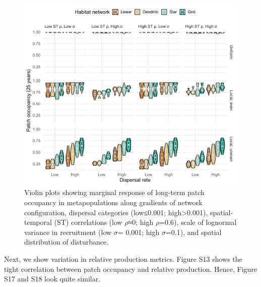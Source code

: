 \documentclass[
]{article}
\begin{document}
\begin{figure}[H]

{\centering \includegraphics{Managing_for_ecological_surprises_in_metapopulations_files/figure-latex/violin plots of risk of patch occupancy-1} 

}

\caption{Violin plots showing marginal response of long-term patch occupancy in metapopulations along gradients of network configuration, dispersal categories (low≤0.001; high>0.001), spatial-temporal (ST) correlations (low $\rho$≈0; high $\rho$=0.6), scale of lognormal variance in recruitment (low $\sigma$= 0.001; high $\sigma$=0.1), and spatial distribution of disturbance.}\label{fig:violin plots of risk of patch occupancy}
\end{figure}

Next, we show variation in relative production metrics. Figure S13 shows
the tight correlation between patch occupancy and relative production.
Hence, Figure S17 and S18 look quite similar.
\end{document}
